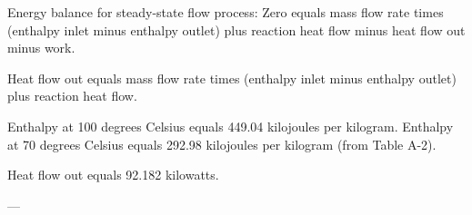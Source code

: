 Energy balance for steady-state flow process:  
Zero equals mass flow rate times (enthalpy inlet minus enthalpy outlet) plus reaction heat flow minus heat flow out minus work.  

Heat flow out equals mass flow rate times (enthalpy inlet minus enthalpy outlet) plus reaction heat flow.  

Enthalpy at 100 degrees Celsius equals 449.04 kilojoules per kilogram.  
Enthalpy at 70 degrees Celsius equals 292.98 kilojoules per kilogram (from Table A-2).  

Heat flow out equals 92.182 kilowatts.  

---